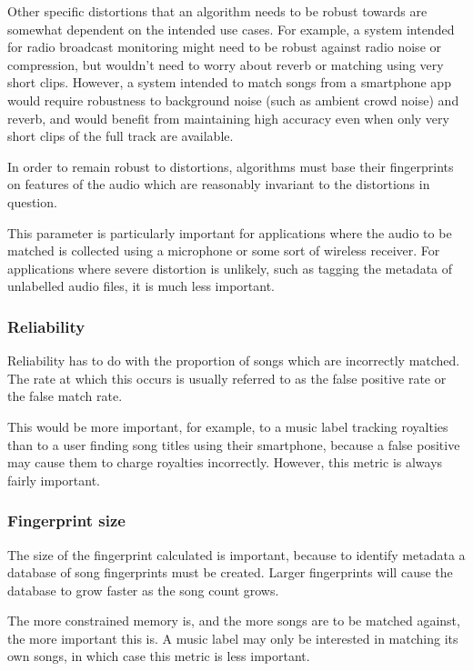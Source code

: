 \documentclass[12pt,a4paper,twoside,openright]{report}
\begin{document}
Other specific distortions that an algorithm needs to be robust towards are somewhat dependent on the intended use cases. For example, a system intended for radio broadcast monitoring might need to be robust against radio noise or compression, but wouldn't need to worry about reverb or matching using very short clips. However, a system intended to match songs from a smartphone app would require robustness to background noise (such as ambient crowd noise) and reverb, and would benefit from maintaining high accuracy even when only very short clips of the full track are available.

In order to remain robust to distortions, algorithms must base their fingerprints on features of the audio which are reasonably invariant to the distortions in question.

This parameter is particularly important for applications where the audio to be matched is collected using a microphone or some sort of wireless receiver. For applications where severe distortion is unlikely, such as tagging the metadata of unlabelled audio files, it is much less important.

\subsubsection{Reliability}

Reliability has to do with the proportion of songs which are incorrectly matched. The rate at which this occurs is usually referred to as the false positive rate or the false match rate.

This would be more important, for example, to a music label tracking royalties than to a user finding song titles using their smartphone, because a false positive may cause them to charge royalties incorrectly. However, this metric is always fairly important.

\subsubsection{Fingerprint size}

The size of the fingerprint calculated is important, because to identify metadata a database of song fingerprints must be created. Larger fingerprints will cause the database to grow faster as the song count grows.

The more constrained memory is, and the more songs are to be matched against, the more important this is. A music label may only be interested in matching its own songs, in which case this metric is less important.
\end{document}
